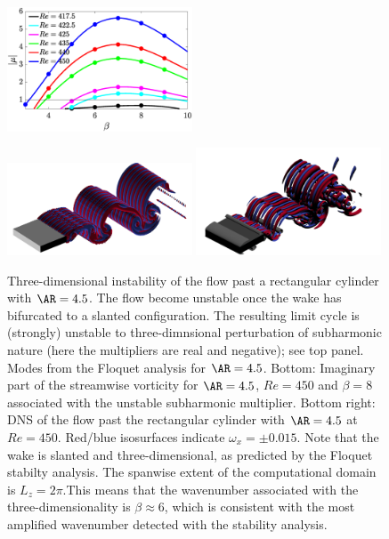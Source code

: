 \begin{figure}
\centering
\includegraphics[width=0.49\textwidth]{./fig/AR4p5/multipliers_3D.eps}
\vspace{0.1cm}
\vspace{0.1cm}
\includegraphics[trim={0 0 0 0},clip,width=0.49\textwidth]{./fig/AR4p5/Floqetmode_beta_8_Re450_AR4p5.png}
\includegraphics[width=0.49\textwidth]{./fig/AR4p5/lambda2_omegax-3D-Re450b.png}
\caption{Three-dimensional instability of the flow past a rectangular cylinder with $\AR=4.5$. The flow become unstable once the wake has bifurcated to a slanted configuration. The resulting limit cycle is (strongly) unstable to three-dimnsional perturbation of subharmonic nature (here the multipliers are real and negative); see top panel. Modes from the Floquet analysis for $\AR=4.5$. Bottom: Imaginary part of the streamwise vorticity for $\AR=4.5$, $Re=450$ and $\beta=8$ associated with the unstable subharmonic multiplier. Bottom right: DNS of the flow past the rectangular cylinder with $\AR=4.5$ at $Re=450$. Red/blue isosurfaces indicate $\omega_x = \pm 0.015$. Note that the wake is slanted and three-dimensional, as predicted by the Floquet stabilty analysis. The spanwise extent of the computational domain is $L_z=2\pi$.This means that the wavenumber associated with the three-dimensionality is $\beta \approx 6$, which is consistent with the most amplified wavenumber detected with the stability analysis.}
\label{fig:AR4p5_modes_Re430_beta0}
\end{figure}


